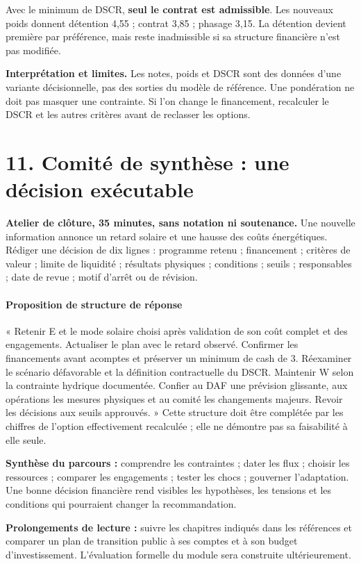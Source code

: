 \documentclass[12pt,a4paper]{article}
\begin{document}
Avec le minimum de DSCR, \textbf{seul le contrat est admissible}. Les nouveaux poids donnent détention 4,55 ; contrat 3,85 ; phasage 3,15. La détention devient première par préférence, mais reste inadmissible si sa structure financière n’est pas modifiée.

\textbf{Interprétation et limites.} Les notes, poids et DSCR sont des données d’une variante décisionnelle, pas des sorties du modèle de référence. Une pondération ne doit pas masquer une contrainte. Si l’on change le financement, recalculer le DSCR et les autres critères avant de reclasser les options.

\section*{11. Comité de synthèse : une décision exécutable}
\textbf{Atelier de clôture, 35 minutes, sans notation ni soutenance.} Une nouvelle information annonce un retard solaire et une hausse des coûts énergétiques. Rédiger une décision de dix lignes : programme retenu ; financement ; critères de valeur ; limite de liquidité ; résultats physiques ; conditions ; seuils ; responsables ; date de revue ; motif d’arrêt ou de révision.



\paragraph{Proposition de structure de réponse}
« Retenir E et le mode solaire choisi après validation de son coût complet et des engagements. Actualiser le plan avec le retard observé. Confirmer les financements avant acomptes et préserver un minimum de cash de 3. Réexaminer le scénario défavorable et la définition contractuelle du DSCR. Maintenir W selon la contrainte hydrique documentée. Confier au DAF une prévision glissante, aux opérations les mesures physiques et au comité les changements majeurs. Revoir les décisions aux seuils approuvés. » Cette structure doit être complétée par les chiffres de l’option effectivement recalculée ; elle ne démontre pas sa faisabilité à elle seule.


\textbf{Synthèse du parcours :} comprendre les contraintes ; dater les flux ; choisir les ressources ; comparer les engagements ; tester les chocs ; gouverner l’adaptation. Une bonne décision financière rend visibles les hypothèses, les tensions et les conditions qui pourraient changer la recommandation.


\textbf{Prolongements de lecture :} suivre les chapitres indiqués dans les références et comparer un plan de transition public à ses comptes et à son budget d’investissement. L’évaluation formelle du module sera construite ultérieurement.
\end{document}

